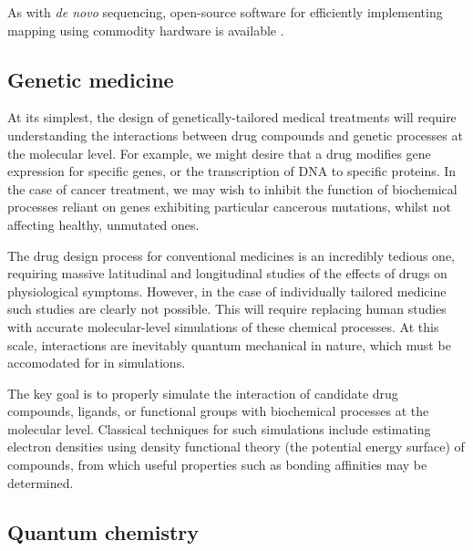 \documentclass[aps,pra,twocolumn,amsmath,amssymb,nofootinbib,superscriptaddress]{revtex4}
\begin{document}
As with \textit{de novo} sequencing, open-source software for efficiently implementing mapping using commodity hardware is available \cite{Bfast etc}.

%
%

\subsection{Genetic medicine}

At its simplest, the design of genetically-tailored medical treatments will require understanding the interactions between drug compounds and genetic processes at the molecular level. For example, we might desire that a drug modifies gene expression for specific genes, or the transcription of DNA to specific proteins. In the case of cancer treatment, we may wish to inhibit the function of biochemical processes reliant on genes exhibiting particular cancerous mutations, whilst not affecting healthy, unmutated ones.

The drug design process for conventional medicines is an incredibly tedious one, requiring massive latitudinal and longitudinal studies of the effects of drugs on physiological symptoms. However, in the case of individually tailored medicine such studies are clearly not possible. This will require replacing human studies with accurate molecular-level simulations of these chemical processes. At this scale, interactions are inevitably quantum mechanical in nature, which must be accomodated for in simulations.

The key goal is to properly simulate the interaction of candidate drug compounds, ligands, or functional groups with biochemical processes at the molecular level. Classical techniques for such simulations include estimating electron densities using density functional theory (the potential energy surface) of compounds, from which useful properties such as bonding affinities may be determined.

%
%

\subsection{Quantum chemistry}
\end{document}
